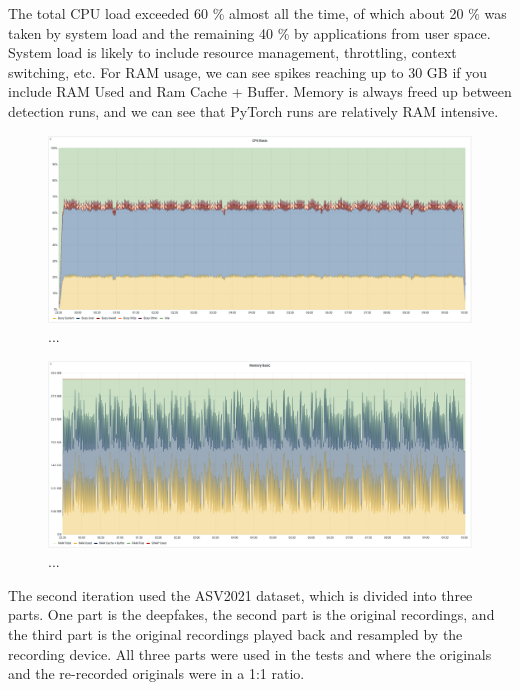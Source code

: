 The total CPU load exceeded 60 \% almost all the time, of which about 20 \% was taken by system load and the remaining 40 \% by applications from user space. System load is likely to include resource management, throttling, context switching, etc. For RAM usage, we can see spikes reaching up to 30 GB if you include RAM Used and Ram Cache + Buffer. Memory is always freed up between detection runs, and we can see that PyTorch runs are relatively RAM intensive.

\begin{figure}[H]
    \centering
    \includegraphics[width=1\linewidth]{other-fig/tests/lj_wf_cpu.png}
    \caption{...}
\end{figure}

\begin{figure}[H]
    \centering
    \includegraphics[width=1\linewidth]{other-fig/tests/lj_wf_ram.png}
    \caption{...}
\end{figure}

The second iteration used the ASV2021 dataset, which is divided into three parts. One part is the deepfakes, the second part is the original recordings, and the third part is the original recordings played back and resampled by the recording device. All three parts were used in the tests and where the originals and the re-recorded originals were in a 1:1 ratio.


